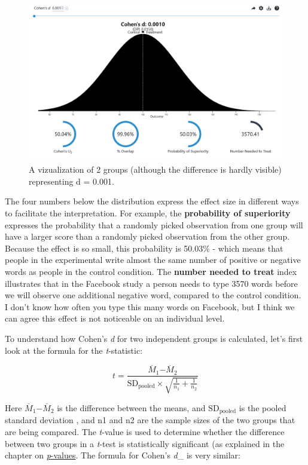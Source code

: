 \documentclass[
  oneside]{krantz}
\begin{document}
\begin{figure}

{\centering \includegraphics[width=1\linewidth]{images/rpsychd1} 

}

\caption{A vizualization of 2 groups (although the difference is hardly visible) representing d = 0.001.}\label{fig:rpsychd1}
\end{figure}

The four numbers below the distribution express the effect size in different ways to facilitate the interpretation. For example, the \textbf{probability of superiority} expresses the probability that a randomly picked observation from one group will have a larger score than a randomly picked observation from the other group. Because the effect is so small, this probability is 50.03\% - which means that people in the experimental write almost the same number of positive or negative words as people in the control condition. The \textbf{number needed to treat} index illustrates that in the Facebook study a person needs to type 3570 words before we will observe one additional negative word, compared to the control condition. I don't know how often you type this many words on Facebook, but I think we can agree this effect is not noticeable on an individual level.

To understand how Cohen's \emph{d} for two independent groups is calculated, let's first look at the formula for the \emph{t}-statistic:

\[
t = \frac{{\overline{M}}_{1}{- \overline{M}}_{2}}{\text{SD}_{\text{pooled}} \times \sqrt{\frac{1}{n_{1}} + \frac{1}{n_{2}}}}
\]

Here \({\overline{M}}_{1}{- \overline{M}}_{2}\) is the difference between the means, and \(\text{SD}_{\text{pooled}}\) is the pooled standard deviation \citep{lakens_calculating_2013}, and n1 and n2 are the sample sizes of the two groups that are being compared. The \emph{t}-value is used to determine whether the difference between two groups in a \emph{t}-test is statistically significant (as explained in the chapter on \protect\hyperlink{pvalue}{\emph{p}-values}. The formula for Cohen's \emph{d}\_ is very similar:
\end{document}
